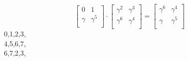 $$
\left[
\begin{array}{*{2}{r}}
0 & 1\\
\gamma  & \gamma^{5}\\
\end{array}
\right]
\cdot
\left[
\begin{array}{*{2}{r}}
\gamma^{2} & \gamma^{3}\\
\gamma^{6} & \gamma^{4}\\
\end{array}
\right]
=
\left[
\begin{array}{*{2}{r}}
\gamma^{6} & \gamma^{4}\\
\gamma  & \gamma^{5}\\
\end{array}
\right]
$$
0,1,2,3,\\
4,5,6,7,\\
6,7,2,3,\\
